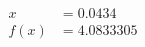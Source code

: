 \documentclass[preview]{standalone}
\begin{document}
\begin{align*}
x &= 0.0434\\f(x) &= 4.0833305
\end{align*}
\end{document}

